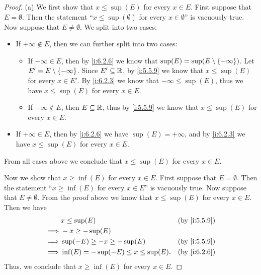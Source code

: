 \begin{proof}{(a)}
  We first show that \(x \leq \sup(E)\) for every \(x \in E\).
  First suppose that \(E = \emptyset\).
  Then the statement ``\(x \leq \sup(\emptyset)\) for every \(x \in \emptyset\)'' is vacuously true.
  Now suppose that \(E \neq \emptyset\).
  We split into two cases:
  \begin{itemize}
    \item If \(+\infty \not\in E\), then we can further split into two cases:
          \begin{itemize}
            \item If \(-\infty \in E\), then by \cref{i:6.2.6} we know that \(\sup(E) = \sup(E \setminus \left\lbrace-\infty\right\rbrace)\).
                  Let \(E' = E \setminus \left\lbrace-\infty\right\rbrace\).
                  Since \(E' \subseteq \mathbb{R}\), by \cref{i:5.5.9} we know that \(x \leq \sup(E)\) for every \(x \in E'\).
                  By \cref{i:6.2.3} we know that \(-\infty \leq \sup(E)\), thus we have \(x \leq \sup(E)\) for every \(x \in E\).
            \item If \(-\infty \notin E\), then \(E \subseteq \mathbb{R}\), thus by \cref{i:5.5.9} we know that \(x \leq \sup(E)\) for every \(x \in E\).
          \end{itemize}
    \item If \(+\infty \in E\), then by \cref{i:6.2.6} we have \(\sup(E) = +\infty\), and by \cref{i:6.2.3} we have \(x \leq \sup(E)\) for every \(x \in E\).
  \end{itemize}
  From all cases above we conclude that \(x \leq \sup(E)\) for every \(x \in E\).

  Now we show that \(x \geq \inf(E)\) for every \(x \in E\).
  First suppose that \(E = \emptyset\).
  Then the statement ``\(x \geq \inf(E)\) for every \(x \in E\)'' is vacuously true.
  Now suppose that \(E \neq \emptyset\).
  From the proof above we know that \(x \leq \sup(E)\) for every \(x \in E\).
  Then we have
  \begin{align*}
             & x \leq \sup(E)                           &  & \by{i:5.5.9} \\
    \implies & -x \geq -\sup(E)                                           \\
    \implies & \sup(-E) \geq -x \geq -\sup(E)           &  & \by{i:5.5.9} \\
    \implies & \inf(E) = -\sup(-E) \leq x \leq \sup(E). &  & \by{i:6.2.6}
  \end{align*}
  Thus, we conclude that \(x \geq \inf(E)\) for every \(x \in E\).
\end{proof}

